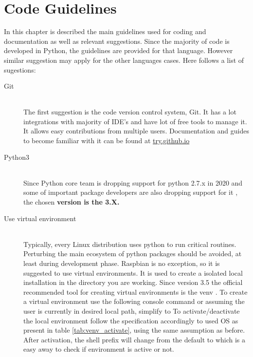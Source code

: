 \chapter{Code Guidelines}
In this chapter is described the main guidelines used for coding and documentation as well as relevant suggestions.
Since the majority of code is developed in Python, the guidelines are provided for that language. However similar suggestion may apply for the other languages cases. Here follows a list of sugestions:
\begin{description}
	\item [Git] \hfill \\The first suggestion is the code version control system, Git. It has a lot integrations with majority of IDE's and have lot of free tools to manage it. It allows easy contributions from multiple users. Documentation and guides to become familiar with it can be found at \href{https://try.github.io/}{try.github.io}
	\item[Python3] \hfill \\ Since Python core team is dropping support for python 2.7.x in 2020 \cite{python_end_of_life} and some of important package developers are also dropping support for it \cite{numpy_end_of_life}, the chosen \textbf{version is the 3.X.}
	\item[Use virtual environment] \hfill\\ Typically, every Linux distribution uses python to run critical routines. Perturbing the main ecosystem of python packages should be avoided, at least during development phase. Raspbian is no exception, so it is suggested to use virtual environments. It is used to create a isolated local installation in the directory you are working. Since version 3.5 the official recommended tool for creating virtual environments is the venv \cite{python_doc}.
	To create a virtual environment use the following console command  or  assuming the user is currently in desired local path, simplify to  
	To activate/deactivate the local environment follow the specification accordingly to used \gls{OS} as present in table \ref{tab:venv_activate}, using the same assumption as before. After activation, the shell prefix will change from the default to  which is a easy away to check if environment is active or not.
	

\end{description}
